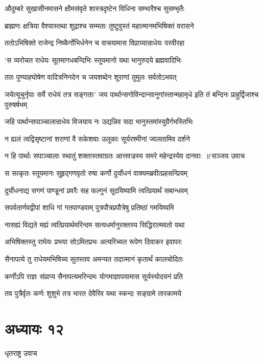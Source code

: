 \twolineshloka
{औदुम्बरे सुखासीनमासने क्षौमसंवृते}
{शास्त्रदृष्टेन विधिना सम्भारैश्च सुसम्भृतैः}


\twolineshloka
{ब्राह्मणः क्षत्रिया वैश्यास्तथा शूद्राश्च सम्मताः}
{तुष्टुवुस्तं महात्मानमभिषिक्तं वरासने}


\twolineshloka
{ततोऽभिषिक्ते राजेन्द्र निष्कैर्गोभिर्धनेन च}
{वाचयामास विप्राग्र्यान्राधेयः परवीरहा}


\twolineshloka
{`स व्यरोचत राधेयः सूतमागधबन्दिभिः}
{स्तूयमानो यथा भानुरुदये ब्रह्मवादिभिः}


\twolineshloka
{ततः पुण्याहघोषेण वादित्रनिनदेन च}
{जयशब्देन शूराणां तुमुलः सर्वतोऽभवत्}


जयेत्यूचुर्नृपाः सर्वे राधेयं तत्र सङ्गताः'
\twolineshloka
{जय पार्थान्सगोविन्दान्सानुगांस्तान्महामृधे}
{इति तं बन्दिनः प्राहुर्द्विजाश्च पुरुषर्षभम्}


\twolineshloka
{जहि पार्थान्सपाञ्चालान्राधेय विजयाय नः}
{उद्यन्निव सदा भानुस्तमांस्युग्रैर्गभस्तिभिः}


\twolineshloka
{न ह्यलं त्वद्विसृष्टानां शराणां वै सकेशवाः}
{उलूकाः सूर्यरश्मीनां ज्वलतामिव दर्शने}


\threelineshloka
{न हि पार्थाः सपाञ्चालाः स्थातुं शक्तास्तवाग्रतः}
{आत्तवज्रस्य समरे महेन्द्रस्येव दानवाः ॥`सञ्जय उवाच}
{}


\twolineshloka
{स सत्कृतः स्तूयमानः सुहृद्गणवृतो रुषा}
{कर्णो दुर्योधनं वाक्यमब्रवीत्प्रहसन्प्रियम्}


\twolineshloka
{दुर्योधनाद्य सगणं पाण्डूनां प्रवरैः सह}
{फल्गुनं सूदयिष्यामि त्वत्प्रियार्थं सबान्धवम्}


\twolineshloka
{सपर्वतार्णवद्वीपां शाधि गां गतपाण्डवाम्}
{पुत्रपौत्रप्रपौत्रेषु प्रतिष्ठां गमयिष्यमि}


\twolineshloka
{नासह्यं विद्यते मह्यं त्वत्प्रियार्थमरिन्दम}
{सत्यधर्मानुरक्तस्य सिद्धिरात्मवतो यथा}


\twolineshloka
{अभिषिक्तस्तु राघेयः प्रभया सोऽमितप्रभः}
{अत्यरिच्यत रूपेण दिवाकर इवापरः}


\twolineshloka
{सैनापत्ये तु राधेयमभिषिच्य सुतस्तव}
{अमन्यत तदात्मानं कृतार्थं कालचोदितः}


\twolineshloka
{कर्णोऽपि राज्ञः संप्राप्य सैनापत्यमरिन्दमः}
{योगमाज्ञापयामास सूर्यस्योदयनं प्रति}


\twolineshloka
{तव पुत्रैर्वृतः कर्णः शुशुभे तत्र भारत}
{देवैरिव यथा स्कन्दः सङ्ग्रामे तारकामये}


\chapter{अध्यायः १२}
\twolineshloka
{धृतराष्ट्र उवाच}
{}


